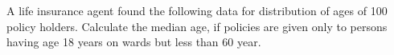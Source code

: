 \begin{flushleft}
A life insurance agent found the following data for distribution of ages of 100 policy
holders. Calculate the median age, if policies are given only to persons having age 18
years on wards but less than 60 year.
\end{flushleft}

\begin{table}[ht!]
\centering

\end{table}

\begin{table}[ht!]
\centering

\end{table}  